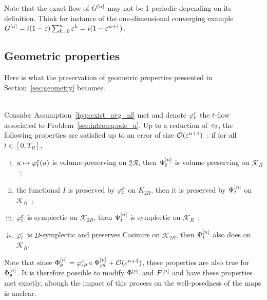 Note that the exact flow of $G^{[n]}$ may not be 1-periodic depending on
its definition. Think for instance of the one-dimensional converging
example $G^{[n]} = i(1-\varepsilon) \sum_{k = 0}^{n} \varepsilon^k = i( 1 - \varepsilon^{n+1}
)$. 


\subsection{Geometric properties}
Here is what the preservation of geometric properties presented in
Section~\ref{sec:geometry} becomes. 

\begin{theorem}
\hspace*{1em} \\
  Consider Assumption~\ref{hyp:exist_avg_nl} met and denote $\varphi^{\varepsilon}
  _t$ the $t$-flow associated to Problem~\eqref{sec:intro:eq:ode_u}. Up to
  a reduction of~$\varepsilon_0$, the following properties are satisfied up to an
  error of size $\mathcal{O}(\varepsilon^{n+1})$~: if for all $t \in [0, T_R]$, 
  \begin{enumerate}[(i)]
    \item $u \mapsto \varphi^{\varepsilon} _t(u)$ is volume-preserving on $\mathcal{2R}$, then
    $\Psi^{[n]} _t$ is volume-preserving on $\mathcal{K}_R$~;
    \item the functional $I$ is preserved by $\varphi^{\varepsilon} _t$ on
    $K_{2R}$, then it is preserved by $\Psi^{[n]} _t$ on
    $\mathcal{K}_R$~; 
    \item $\varphi^{\varepsilon} _t$ is symplectic on $\mathcal{K}_{2R}$, then
    $\Psi^{[n]} _t$ is symplectic on $\mathcal{K}_R$~;
    \item $\varphi^{\varepsilon} _t$ is $B$-symplectic and preserves Casimirs on
    $\mathcal{K}_{2R}$, then $\Psi^{[n]} _t$ also does on $\mathcal{K}_R$.
  \end{enumerate}
  Note that since $\Phi^{[n]} _\theta = \varphi^{\varepsilon} _{\varepsilon\theta} \circ
  \Psi^{[n]} _{\varepsilon\theta} + \mathcal{O}(\varepsilon^{n+1})$, these properties are also
  true for $\Phi^{[n]} _\theta$. It is therefore possible to modify $\Phi^{[n]}$ and $F^{[n]}$ and have these properties met exactly, altough the
  impact of this process on the well-posedness of the maps is unclear.
\end{theorem}

